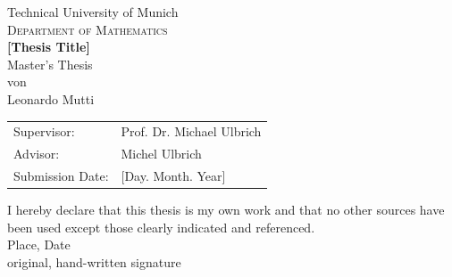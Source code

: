 \documentclass[english,a4paper,9pt,oneside]{scrbook}	%
\theoremstyle{break}
\theoremstyle{remark}
\begin{document}
\pagestyle{empty}       %
  \parbox{1.5cm}{}\hspace{310pt}%
  \parbox{1.5cm}{}%
\vspace*{1.5cm}
\begin{center}
{\Huge Technical University of Munich}
\\
\vspace*{1.5cm}
{\huge \textsc{Department of Mathematics}}
\\
\vspace*{3cm}
{\Huge \textbf{[Thesis Title]}}
\\
\vspace*{3cm}
{\Large Master's Thesis}\linebreak \\
{\Large von}\linebreak \\
{\Large Leonardo Mutti}\\
\vspace*{3cm}
{\Large 
\begin{tabular}{ll}
Supervisor: & Prof. Dr. Michael Ulbrich\\
Advisor: & Michel Ulbrich\\
Submission Date: & [Day. Month. Year]
\end{tabular}
}
\end{center}
\newpage    %

\vspace*{18cm}
\noindent
I hereby declare that this thesis is my own work and that no other sources have been used except those clearly indicated and referenced.
\\[2cm]
Place, Date\\
original, hand-written signature
\newpage
\end{document}
